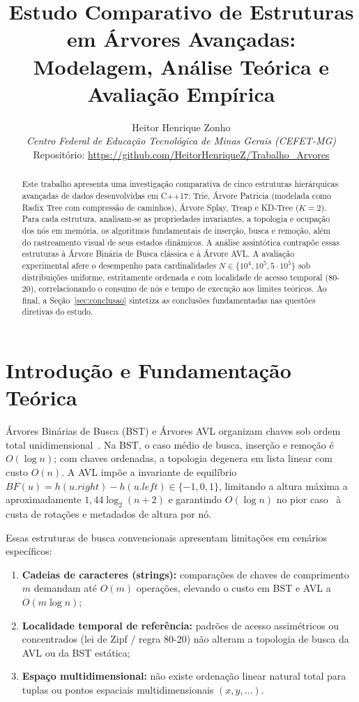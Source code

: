 \documentclass[11pt, a4paper]{article}
\title{\textbf{Estudo Comparativo de Estruturas em Árvores Avançadas: \\ Modelagem, Análise Teórica e Avaliação Empírica}}
\author{Heitor Henrique Zonho \\ \textit{Centro Federal de Educação Tecnológica de Minas Gerais (CEFET-MG)} \\ \small Repositório: \url{https://github.com/HeitorHenriqueZ/Trabalho_Arvores}}
\date{}
\begin{document}
\maketitle

\begin{abstract}
Este trabalho apresenta uma investigação comparativa de cinco estruturas hierárquicas avançadas de dados desenvolvidas em C++17: Trie, Árvore Patricia (modelada como Radix Tree com compressão de caminhos), Árvore Splay, Treap e KD-Tree ($K=2$). Para cada estrutura, analisam-se as propriedades invariantes, a topologia e ocupação dos nós em memória, os algoritmos fundamentais de inserção, busca e remoção, além do rastreamento visual de seus estados dinâmicos. A análise assintótica contrapõe essas estruturas à Árvore Binária de Busca clássica e à Árvore AVL. A avaliação experimental afere o desempenho para cardinalidades $N \in \{10^{4}, 10^{5}, 5\cdot10^{5}\}$ sob distribuições uniforme, estritamente ordenada e com localidade de acesso temporal (80-20), correlacionando o consumo de nós e tempo de execução aos limites teóricos. Ao final, a Seção~\ref{sec:conclusao} sintetiza as conclusões fundamentadas nas questões diretivas do estudo.
\end{abstract}

\section{Introdução e Fundamentação Teórica}

Árvores Binárias de Busca (BST) e Árvores AVL organizam chaves sob ordem total unidimensional~\cite{cormen2009}. Na BST, o caso médio de busca, inserção e remoção é $O(\log n)$; com chaves ordenadas, a topologia degenera em lista linear com custo $O(n)$. A AVL impõe a invariante de equilíbrio $BF(u)=h(u.right)-h(u.left)\in\{-1,0,1\}$, limitando a altura máxima a aproximadamente $1{,}44\log_2(n+2)$ e garantindo $O(\log n)$ no pior caso~\cite{sedgewick2011} à custa de rotações e metadados de altura por nó.

Essas estruturas de busca convencionais apresentam limitações em cenários específicos:
\begin{enumerate}
    \item \textbf{Cadeias de caracteres (strings):} comparações de chaves de comprimento $m$ demandam até $O(m)$ operações, elevando o custo em BST e AVL a $O(m\log n)$;
    \item \textbf{Localidade temporal de referência:} padrões de acesso assimétricos ou concentrados (lei de Zipf / regra 80-20) não alteram a topologia de busca da AVL ou da BST estática;
    \item \textbf{Espaço multidimensional:} não existe ordenação linear natural total para tuplas ou pontos espaciais multidimensionais $(x,y,\ldots)$.
\end{enumerate}
\end{document}
